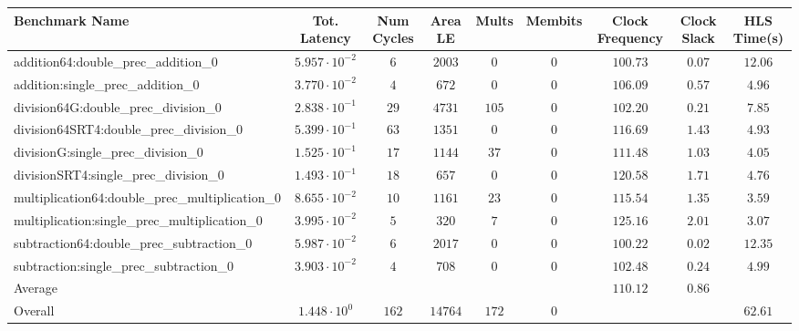 \begin{tabular}{|l|c|c|c|c|c|c|c|c|}
\hline
Benchmark Name                                   & Tot. Latency            & Num Cycles & Area LE   & Mults   & Membits & Clock Frequency & Clock Slack & HLS Time(s) \\
\hline
addition64:double\_prec\_addition\_0             & $ 5.957 \cdot 10^{-2} $ & $ 6      $ & $ 2003  $ & $ 0   $ & $ 0   $ & $ 100.73      $ & $ 0.07    $ & $ 12.06   $ \\
addition:single\_prec\_addition\_0               & $ 3.770 \cdot 10^{-2} $ & $ 4      $ & $ 672   $ & $ 0   $ & $ 0   $ & $ 106.09      $ & $ 0.57    $ & $ 4.96    $ \\
division64G:double\_prec\_division\_0            & $ 2.838 \cdot 10^{-1} $ & $ 29     $ & $ 4731  $ & $ 105 $ & $ 0   $ & $ 102.20      $ & $ 0.21    $ & $ 7.85    $ \\
division64SRT4:double\_prec\_division\_0         & $ 5.399 \cdot 10^{-1} $ & $ 63     $ & $ 1351  $ & $ 0   $ & $ 0   $ & $ 116.69      $ & $ 1.43    $ & $ 4.93    $ \\
divisionG:single\_prec\_division\_0              & $ 1.525 \cdot 10^{-1} $ & $ 17     $ & $ 1144  $ & $ 37  $ & $ 0   $ & $ 111.48      $ & $ 1.03    $ & $ 4.05    $ \\
divisionSRT4:single\_prec\_division\_0           & $ 1.493 \cdot 10^{-1} $ & $ 18     $ & $ 657   $ & $ 0   $ & $ 0   $ & $ 120.58      $ & $ 1.71    $ & $ 4.76    $ \\
multiplication64:double\_prec\_multiplication\_0 & $ 8.655 \cdot 10^{-2} $ & $ 10     $ & $ 1161  $ & $ 23  $ & $ 0   $ & $ 115.54      $ & $ 1.35    $ & $ 3.59    $ \\
multiplication:single\_prec\_multiplication\_0   & $ 3.995 \cdot 10^{-2} $ & $ 5      $ & $ 320   $ & $ 7   $ & $ 0   $ & $ 125.16      $ & $ 2.01    $ & $ 3.07    $ \\
subtraction64:double\_prec\_subtraction\_0       & $ 5.987 \cdot 10^{-2} $ & $ 6      $ & $ 2017  $ & $ 0   $ & $ 0   $ & $ 100.22      $ & $ 0.02    $ & $ 12.35   $ \\
subtraction:single\_prec\_subtraction\_0         & $ 3.903 \cdot 10^{-2} $ & $ 4      $ & $ 708   $ & $ 0   $ & $ 0   $ & $ 102.48      $ & $ 0.24    $ & $ 4.99    $ \\
\hline
Average                                          & $                     $ & $        $ & $       $ & $     $ & $     $ & $ 110.12      $ & $ 0.86    $ & $         $ \\
\hline
Overall                                          & $ 1.448 \cdot 10^{0}  $ & $ 162    $ & $ 14764 $ & $ 172 $ & $ 0   $ & $             $ & $         $ & $ 62.61   $ \\
\hline
\end{tabular}
